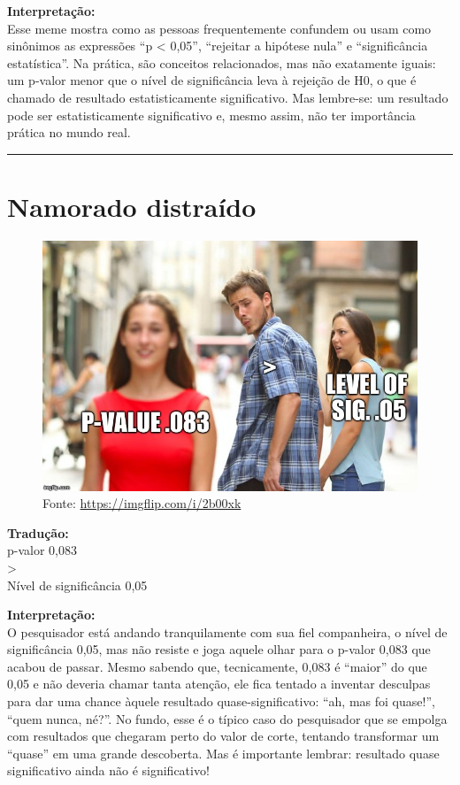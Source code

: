 \documentclass[
]{book}
\begin{document}
\textbf{Interpretação:}\\
Esse meme mostra como as pessoas frequentemente confundem ou usam como sinônimos as expressões ``p \textless{} 0,05'', ``rejeitar a hipótese nula'' e ``significância estatística''. Na prática, são conceitos relacionados, mas não exatamente iguais: um p-valor menor que o nível de significância leva à rejeição de H0, o que é chamado de resultado estatisticamente significativo. Mas lembre-se: um resultado pode ser estatisticamente significativo e, mesmo assim, não ter importância prática no mundo real.

\begin{center}\rule{0.5\linewidth}{0.5pt}\end{center}

\section{Namorado distraído}\label{namorado-distrauxeddo}

\begin{figure}
\centering
\includegraphics{p-values2.jpg}
\caption{Fonte: \url{https://imgflip.com/i/2b00xk}}
\end{figure}

\textbf{Tradução:}\\
p-valor 0,083\\
\textgreater{}\\
Nível de significância 0,05

\textbf{Interpretação:}\\
O pesquisador está andando tranquilamente com sua fiel companheira, o nível de significância 0,05, mas não resiste e joga aquele olhar para o p-valor 0,083 que acabou de passar. Mesmo sabendo que, tecnicamente, 0,083 é ``maior'' do que 0,05 e não deveria chamar tanta atenção, ele fica tentado a inventar desculpas para dar uma chance àquele resultado quase-significativo: ``ah, mas foi quase!'', ``quem nunca, né?''. No fundo, esse é o típico caso do pesquisador que se empolga com resultados que chegaram perto do valor de corte, tentando transformar um ``quase'' em uma grande descoberta. Mas é importante lembrar: resultado quase significativo ainda não é significativo!
\end{document}
